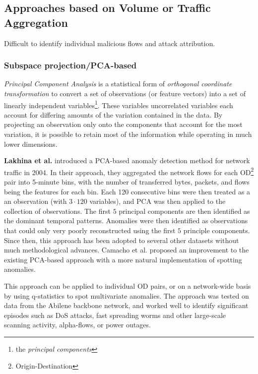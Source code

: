 \documentclass[a4paper,12pt,twoside]{report}
\begin{document}
\subsection{Approaches based on Volume or Traffic Aggregation}

Difficult to identify individual malicious flows and attack attribution.


\subsubsection{Subspace projection/PCA-based}

\textit{Principal Component Analysis} is a statistical form of \textit{orthogonal coordinate transformation} to convert a set of observations (or feature vectors) into a set of linearly independent variables\footnote{the \textit{principal components}}. These variables uncorrelated variables each account for differing amounts of the variation contained in the data. By projecting an observation only onto the components that account for the most variation, it is possible to retain most of the information while operating in much lower dimensions.

\textbf{Lakhina et al.} \cite{lakhina_diagnosing_2004,lakhina_characterization_2004}  introduced a PCA-based anomaly detection method for network traffic in 2004. In their approach, they aggregated the network flows for each OD\footnote{Origin-Destination} pair into 5-minute bins, with the number of transferred bytes, packets, and flows being the features for each bin. Each 120 consecutive bins were then treated as a an observation (with $3\cdot 120$ variables), and PCA was then applied to the collection of observations. The first $5$ principal components are then identified as the dominant temporal patterns. Anomalies were then identified as observations that could only very poorly reconstructed using the first $5$ principle components. Since then, this approach has been adopted to several other datasets without much methodological advances. Camacho et al. \cite{camacho_pca-based_2016} proposed an improvement to the existing PCA-based approach with a more natural implementation of spotting anomalies. 

This approach can be applied to individual OD pairs, or on a network-wide basis by using q-statistics to spot multivariate anomalies. The approach was tested on data from the Abilene backbone network, and worked well to identify significant episodes such as DoS attacks, fast spreading worms and other large-scale scanning activity, alpha-flows, or power outages. 
\end{document}
